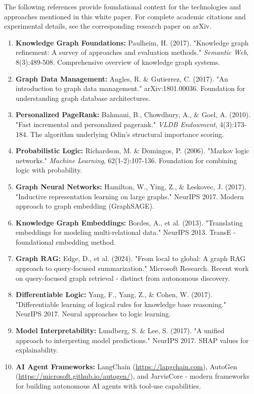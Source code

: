 \documentclass[11pt]{article}
\begin{document}
The following references provide foundational context for the technologies and approaches mentioned in this white paper. For complete academic citations and experimental details, see the corresponding research paper on arXiv.

\begin{enumerate}
\item \textbf{Knowledge Graph Foundations:} Paulheim, H. (2017). "Knowledge graph refinement: A survey of approaches and evaluation methods." \textit{Semantic Web}, 8(3):489-508. Comprehensive overview of knowledge graph systems.

\item \textbf{Graph Data Management:} Angles, R. \& Gutierrez, C. (2017). "An introduction to graph data management." arXiv:1801.00036. Foundation for understanding graph database architectures.

\item \textbf{Personalized PageRank:} Bahmani, B., Chowdhury, A., \& Goel, A. (2010). "Fast incremental and personalized pagerank." \textit{VLDB Endowment}, 4(3):173-184. The algorithm underlying Odin's structural importance scoring.

\item \textbf{Probabilistic Logic:} Richardson, M. \& Domingos, P. (2006). "Markov logic networks." \textit{Machine Learning}, 62(1-2):107-136. Foundation for combining logic with probability.

\item \textbf{Graph Neural Networks:} Hamilton, W., Ying, Z., \& Leskovec, J. (2017). "Inductive representation learning on large graphs." NeurIPS 2017. Modern approach to graph embedding (GraphSAGE).

\item \textbf{Knowledge Graph Embeddings:} Bordes, A., et al. (2013). "Translating embeddings for modeling multi-relational data." NeurIPS 2013. TransE - foundational embedding method.

\item \textbf{Graph RAG:} Edge, D., et al. (2024). "From local to global: A graph RAG approach to query-focused summarization." Microsoft Research. Recent work on query-focused graph retrieval - distinct from autonomous discovery.

\item \textbf{Differentiable Logic:} Yang, F., Yang, Z., \& Cohen, W. (2017). "Differentiable learning of logical rules for knowledge base reasoning." NeurIPS 2017. Neural approaches to logic learning.

\item \textbf{Model Interpretability:} Lundberg, S. \& Lee, S. (2017). "A unified approach to interpreting model predictions." NeurIPS 2017. SHAP values for explainability.

\item \textbf{AI Agent Frameworks:} LangChain (\url{https://langchain.com}), AutoGen (\url{https://microsoft.github.io/autogen/}), and JarvisCore - modern frameworks for building autonomous AI agents with tool-use capabilities.
\end{enumerate}
\end{document}
